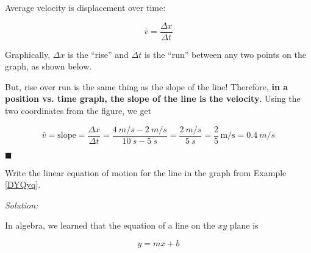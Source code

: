 \documentclass[dvipsnames]{article}
\begin{document}
Average velocity is displacement over time:

\begin{equation*}
    \bar{v} = \frac{\Delta x}{\Delta t}
\end{equation*}

Graphically, $\Delta x$ is the ``rise'' and $\Delta t$ is the ``run'' between any two points on the graph, as shown below.


\begin{center}
\end{center}

But, rise over run is the same thing as the slope of the line! Therefore, \textbf{in a position vs. time graph, the slope of the line is the velocity}. Using the two coordinates from the figure, we get

\begin{equation*}
    \bar{v} = \text{slope} = \frac{\Delta x}{\Delta t} = \frac{\SI{4}{m/s} - \SI{2}{m/s}}{\SI{10}{s} - \SI{5}{s}} = \frac{\SI{2}{m/s}}{\SI{5}{s}} = \frac{2}{5}\,\text{m/s} = \boxed{\SI{0.4}{m/s}}
\end{equation*}

\hfill $\blacksquare$



\begin{example}
Write the linear equation of motion for the line in the graph from Example \ref{DYQyq}.
\end{example}

\textit{Solution:}

In algebra, we learned that the equation of a line on the $xy$ plane is

\begin{equation*}
    y = mx + b
\end{equation*}
\end{document}
